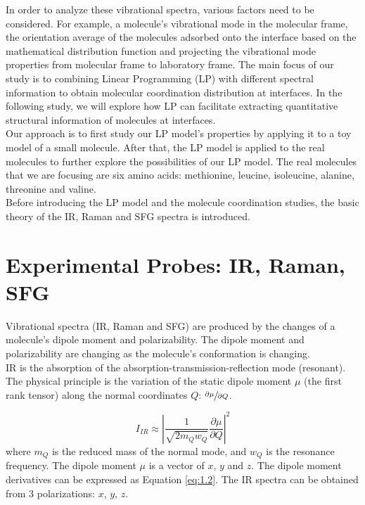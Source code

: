 In order to analyze these vibrational spectra, various factors need to be considered. For example, a molecule's vibrational mode in the molecular frame, the orientation average of the molecules adsorbed onto the interface based on the mathematical distribution function and projecting the vibrational mode properties from molecular frame to laboratory frame. The main focus of our study is to combining Linear Programming (LP) with different spectral information to obtain molecular coordination distribution at interfaces. In the following study, we will explore how LP can facilitate extracting quantitative structural information of molecules at interfaces.\\

Our approach is to first study our LP model's properties by applying it to a toy model of a small molecule. After that, the LP model is applied to the real molecules to further explore the possibilities of our LP model. The real molecules that we are focusing are six amino acids: methionine, leucine, isoleucine, alanine, threonine and valine.\\

Before introducing the LP model and the molecule coordination studies, the basic theory of  the IR, Raman and SFG spectra is introduced.\\

\section{Experimental Probes: IR, Raman, SFG}
Vibrational spectra (IR, Raman and SFG) are produced by the changes of a molecule's dipole moment and polarizability. The dipole moment and polarizability are changing as the molecule's conformation is changing. \\

IR is the absorption of the absorption-transmission-reflection mode (resonant). The physical principle is the variation of the static dipole moment $\mu$ (the first rank tensor) along the normal coordinates $Q$: $\sfrac{\partial\mu}{\partial Q}$. 

\begin{equation} \label{eq:1.1}
I_{IR} \approx \left| \frac{1}{\sqrt{2m_{Q}w_{Q}}} \frac{\partial\mu}{\partial Q} \right|^{2}
\end{equation}
where $m_{Q}$ is the reduced mass of the normal mode, and $w_{Q}$ is the resonance frequency. The dipole moment $\mu$ is a vector of $x$, $y$ and $z$. The dipole moment derivatives can be expressed as Equation \ref{eq:1.2}. The IR spectra can be obtained from 3 polarizations: $x$, $y$, $z$. 

